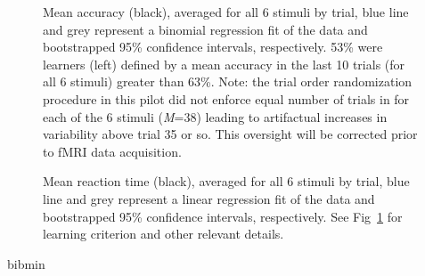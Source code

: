 \documentclass[doc,12pt]{apa}        %
\begin{document}
\begin{figure}[tp]
	\label{fig:acc}
	\caption{Mean accuracy (black), averaged for all 6 stimuli by trial, blue line and grey represent a binomial regression fit of the data and bootstrapped 95\% confidence intervals, respectively.  53\% were learners (left) defined by a mean accuracy in the last 10 trials (for all 6 stimuli) greater than 63\%. Note: the trial order randomization procedure in this pilot did not enforce equal number of trials in for each of the 6 stimuli (\emph{M}=38) leading to artifactual increases in variability above trial 35 or so.  This oversight will be corrected prior to fMRI data acquisition.}
\end{figure}

\begin{figure}[tp]
	\label{fig:rt}
	\caption{Mean reaction time (black), averaged for all 6 stimuli by trial, blue line and grey represent a linear regression fit of the data and bootstrapped 95\% confidence intervals, respectively. See Fig~\ref{fig:acc} for learning criterion and other relevant details.}
\end{figure}

\newpage
 {bibmin}

\end{document}
